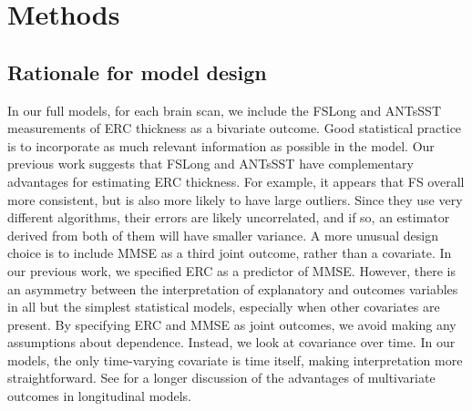 \documentclass[12pt]{article}
\begin{document}
\pagebreak
\section{Methods}

\subsection{Rationale for model design}

In our full models, for each brain scan, we include the FSLong and ANTsSST measurements of ERC thickness as a bivariate outcome. Good statistical practice is to incorporate as much relevant information as possible in the model. Our previous work suggests that FSLong and ANTsSST have complementary advantages for estimating ERC thickness. For example, it appears that FS overall more consistent, but is also more likely to have large outliers. Since they use very different algorithms, their errors are likely uncorrelated, and if so, an estimator derived from both of them will have smaller variance. A more unusual design choice is to include MMSE as a third joint outcome, rather than a covariate. In our previous work, we specified ERC as a predictor of MMSE. However, there is an asymmetry between the interpretation of explanatory and outcomes variables in all but the simplest statistical models, especially when other covariates are present. By specifying ERC and MMSE as joint outcomes, we avoid making any assumptions about dependence. Instead, we look at covariance over time. In our models, the only time-varying covariate is time itself, making interpretation more straightforward. See \citet{weiss2005modeling} for a longer discussion of the advantages of multivariate outcomes in longitudinal models.
\end{document}
